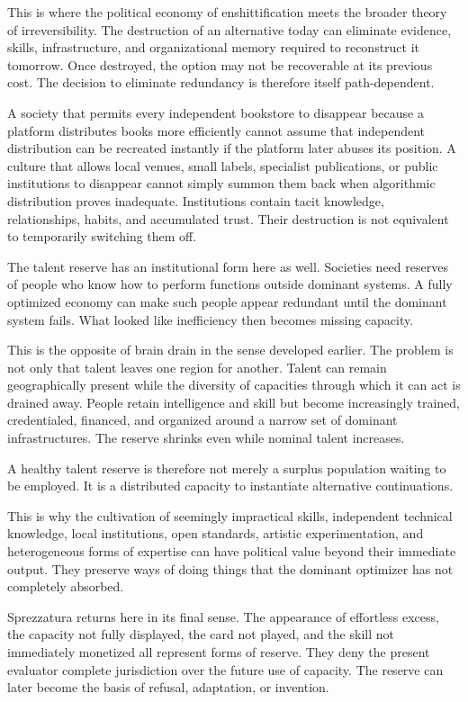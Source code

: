 \documentclass[11pt]{article}
\begin{document}
This is where the political economy of enshittification meets the broader theory of irreversibility. The destruction of an alternative today can eliminate evidence, skills, infrastructure, and organizational memory required to reconstruct it tomorrow. Once destroyed, the option may not be recoverable at its previous cost. The decision to eliminate redundancy is therefore itself path-dependent.

A society that permits every independent bookstore to disappear because a platform distributes books more efficiently cannot assume that independent distribution can be recreated instantly if the platform later abuses its position. A culture that allows local venues, small labels, specialist publications, or public institutions to disappear cannot simply summon them back when algorithmic distribution proves inadequate. Institutions contain tacit knowledge, relationships, habits, and accumulated trust. Their destruction is not equivalent to temporarily switching them off.

The talent reserve has an institutional form here as well. Societies need reserves of people who know how to perform functions outside dominant systems. A fully optimized economy can make such people appear redundant until the dominant system fails. What looked like inefficiency then becomes missing capacity.

This is the opposite of brain drain in the sense developed earlier. The problem is not only that talent leaves one region for another. Talent can remain geographically present while the diversity of capacities through which it can act is drained away. People retain intelligence and skill but become increasingly trained, credentialed, financed, and organized around a narrow set of dominant infrastructures. The reserve shrinks even while nominal talent increases.

A healthy talent reserve is therefore not merely a surplus population waiting to be employed. It is a distributed capacity to instantiate alternative continuations.

This is why the cultivation of seemingly impractical skills, independent technical knowledge, local institutions, open standards, artistic experimentation, and heterogeneous forms of expertise can have political value beyond their immediate output. They preserve ways of doing things that the dominant optimizer has not completely absorbed.

Sprezzatura returns here in its final sense. The appearance of effortless excess, the capacity not fully displayed, the card not played, and the skill not immediately monetized all represent forms of reserve. They deny the present evaluator complete jurisdiction over the future use of capacity. The reserve can later become the basis of refusal, adaptation, or invention.
\end{document}
